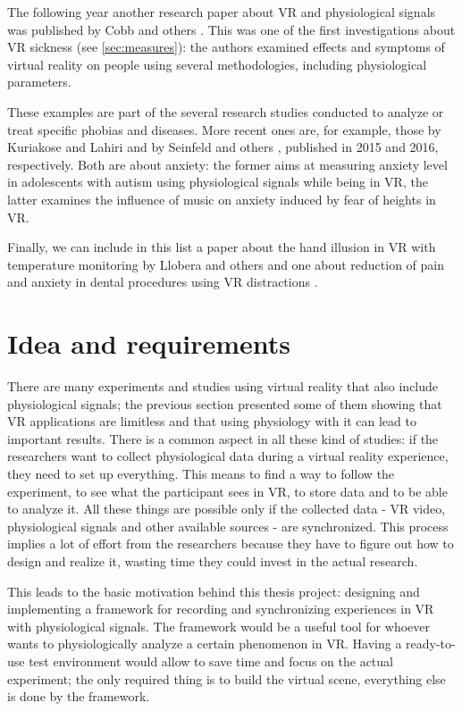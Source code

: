 \documentclass[binding=0.6cm,LaM]{sapthesis}
\begin{document}
The following year another research paper about VR and physiological signals was published by Cobb and others \cite{cobb1999virtual}. This was one of the first investigations about VR sickness (see \ref{sec:measures}): the authors examined effects and symptoms of virtual reality on people using several methodologies, including physiological parameters.

These examples are part of the several research studies conducted to analyze or treat specific phobias and diseases. More recent ones are, for example, those by Kuriakose and Lahiri \cite{kuriakose2015understanding} and by Seinfeld and others \cite{seinfeld2016influence}, published in 2015 and 2016, respectively. Both are about anxiety: the former aims at measuring anxiety level in adolescents with autism using physiological signals while being in VR, the latter examines the influence of music on anxiety induced by fear of heights in VR. 

Finally, we can include in this list a paper about the hand illusion in VR with temperature monitoring by Llobera and others \cite{llobera2013relationship} and one about reduction of pain and anxiety in dental procedures using VR distractions \cite{wiederhold2014clinical}.

\section{Idea and requirements}
There are many experiments and studies using virtual reality that also include physiological signals; the previous section presented some of them showing that VR applications are limitless and that using physiology with it can lead to important results.
There is a common aspect in all these kind of studies: if the researchers want to collect physiological data during a virtual reality experience, they need to set up everything. This means to find a way to follow the experiment, to see what the participant sees in VR, to store data and to be able to analyze it. All these things are possible only if the collected data - VR video, physiological signals and other available sources - are synchronized. This process implies a lot of effort from the researchers because they have to figure out how to design and realize it, wasting time they could invest in the actual research.

This leads to the basic motivation behind this thesis project: designing and implementing a framework for recording and synchronizing experiences in VR with physiological signals. The framework would be a useful tool for whoever wants to physiologically analyze a certain phenomenon in VR. Having a ready-to-use test environment would allow to save time and focus on the actual experiment; the only required thing is to build the virtual scene, everything else is done by the framework.
\end{document}
